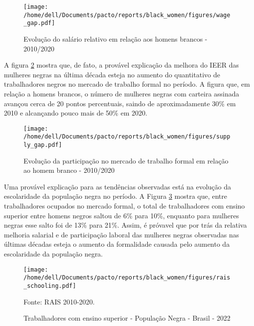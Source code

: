 \documentclass[12pt]{article}
\begin{document}
\begin{figure}[H]
    \centering
    \caption{Evolução do salário relativo em relação aos homens brancos - 2010/2020}
        \texttt{[image: /home/dell/Documents/pacto/reports/black\_women/figures/wage\_gap.pdf]}
    \label{fig:wage_gap}
\end{figure}

\par A figura \ref{fig:supply_gap} mostra que, de fato, a provável explicação da melhora do IEER das mulheres negras na última década esteja no aumento do quantitativo de trabalhadores negros no mercado de trabalho formal no período. A figura que, em relação a homens brancos, o número de mulheres negras com carteira assinada avançou cerca de 20 pontos percentuais, saindo de aproximadamente 30\% em 2010 e alcançando pouco mais de 50\% em 2020.


\begin{figure}[H]
    \centering
    \caption{Evolução da participação no mercado de trabalho formal em relação ao homem branco - 2010/2020}
        \texttt{[image: /home/dell/Documents/pacto/reports/black\_women/figures/supply\_gap.pdf]}
    \label{fig:supply_gap}
\end{figure}

\par Uma provável explicação para as tendências observadas está na evolução da escolaridade da população negra no período. A Figura \ref{fig:rais_schooling} mostra que, entre trabalhadores ocupados no mercado formal, o total de trabalhadores com ensino superior entre homens negros saltou de 6\% para 10\%, enquanto para mulheres negras esse salto foi de 13\% para 21\%. Assim, é próvavel que por trás da relativa melhoria salarial e de participação laboral das mulheres negras observadas nas últimas décadas esteja o aumento da formalidade causada pelo aumento da escolaridade da população negra.

% 
% 

\begin{figure}[H]
    \centering
    \caption{Trabalhadores com ensino superior - População Negra - Brasil - 2022}
        \texttt{[image: /home/dell/Documents/pacto/reports/black\_women/figures/rais\_schooling.pdf]}
    \label{fig:rais_schooling}
    \begin{floatnotes}
        \item[Fonte:] RAIS 2010-2020.
    \end{floatnotes}
\end{figure}
\end{document}
